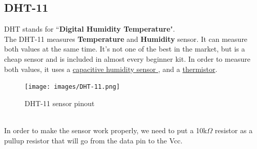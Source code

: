 \documentclass[14pt]{article}
\begin{document}
		\subsection{DHT-11}
			\begin{normalsize}
				DHT stands for ``\textbf{Digital Humidity Temperature}".\\
				
				The DHT-11 measures \textbf{Temperature} and \textbf{Humidity} sensor. It can measure both values at the same time. It's not one of the best in the market, but is a cheap sensor and is included in almost every beginner kit. In order to measure both values, it uses a \href{https://atlas-scientific.com/blog/humidity-sensor-types/}{capacitive humidity sensor }, and a \href{https://www.teamwavelength.com/thermistor-basics/}{thermistor}.
				\begin{figure}[h]
					\centering
					\texttt{[image: images/DHT-11.png]}
					\caption{DHT-11 sensor pinout}
				\end{figure}\\
				In order to make the sensor work properly, we need to put a 10k$\Omega$ resistor as a pullup resistor that will go from the data pin to the Vcc.

\end{normalsize}
\end{document}
